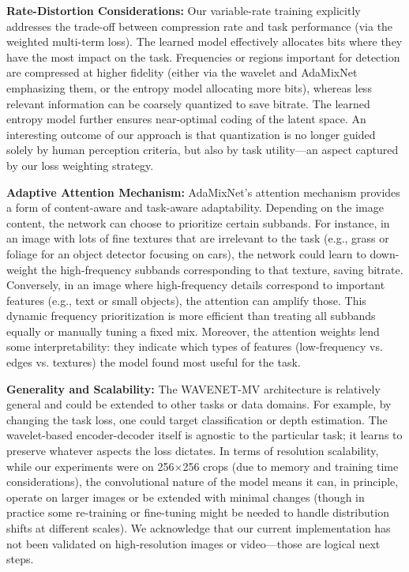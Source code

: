 \documentclass[conference]{IEEEtran}
\begin{document}
\textbf{Rate-Distortion Considerations:} Our variable-rate training explicitly addresses the trade-off between compression rate and task performance (via the weighted multi-term loss). The learned model effectively allocates bits where they have the most impact on the task. Frequencies or regions important for detection are compressed at higher fidelity (either via the wavelet and AdaMixNet emphasizing them, or the entropy model allocating more bits), whereas less relevant information can be coarsely quantized to save bitrate. The learned entropy model further ensures near-optimal coding of the latent space. An interesting outcome of our approach is that quantization is no longer guided solely by human perception criteria, but also by task utility—an aspect captured by our loss weighting strategy.

\textbf{Adaptive Attention Mechanism:} AdaMixNet's attention mechanism provides a form of content-aware and task-aware adaptability. Depending on the image content, the network can choose to prioritize certain subbands. For instance, in an image with lots of fine textures that are irrelevant to the task (e.g., grass or foliage for an object detector focusing on cars), the network could learn to down-weight the high-frequency subbands corresponding to that texture, saving bitrate. Conversely, in an image where high-frequency details correspond to important features (e.g., text or small objects), the attention can amplify those. This dynamic frequency prioritization is more efficient than treating all subbands equally or manually tuning a fixed mix. Moreover, the attention weights lend some interpretability: they indicate which types of features (low-frequency vs. edges vs. textures) the model found most useful for the task.

\textbf{Generality and Scalability:} The WAVENET-MV architecture is relatively general and could be extended to other tasks or data domains. For example, by changing the task loss, one could target classification or depth estimation. The wavelet-based encoder-decoder itself is agnostic to the particular task; it learns to preserve whatever aspects the loss dictates. In terms of resolution scalability, while our experiments were on 256×256 crops (due to memory and training time considerations), the convolutional nature of the model means it can, in principle, operate on larger images or be extended with minimal changes (though in practice some re-training or fine-tuning might be needed to handle distribution shifts at different scales). We acknowledge that our current implementation has not been validated on high-resolution images or video—those are logical next steps.
\end{document}
